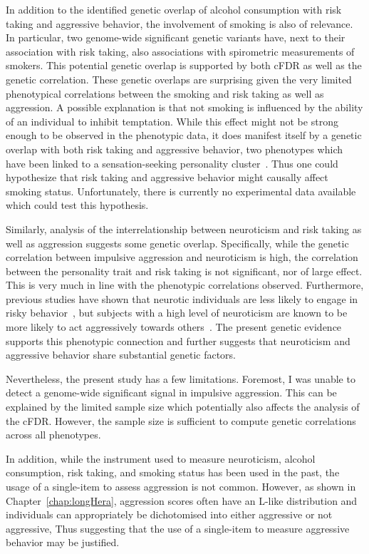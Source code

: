 In addition to the identified genetic overlap of alcohol consumption with risk taking and aggressive behavior, the involvement of smoking is also of relevance.
In particular, two genome-wide significant genetic variants have, next to their association with risk taking, also associations with spirometric measurements of smokers.
This potential genetic overlap is supported by both cFDR as well as the genetic correlation.
These genetic overlaps are surprising given the very limited phenotypical correlations between the smoking and risk taking as well as aggression.
A possible explanation is that not smoking is influenced by the ability of an individual to  inhibit temptation.
While this effect might not be strong enough to be observed in the phenotypic data, it does manifest itself by a genetic overlap with both risk taking and aggressive behavior,
two phenotypes which have been linked to a sensation-seeking personality cluster~\cite{Zuckerman2000}.
Thus one could hypothesize that risk taking and aggressive behavior might causally affect smoking status.
Unfortunately, there is currently no experimental data available which could test this hypothesis.

Similarly, analysis of the interrelationship between neuroticism and risk taking as well as aggression suggests some genetic overlap.
Specifically, while the genetic correlation between impulsive aggression and neuroticism is high, the correlation between the personality trait and risk taking is not significant, nor of large effect.
This is very much in line with the phenotypic correlations observed.
Furthermore, previous studies have shown that neurotic individuals are less likely to engage in risky behavior~\cite{Lauriola2001,InstituteofMedicine2011,Paulus2003}, but subjects with a high level of neuroticism are known to be more likely to act aggressively towards others~\cite{Meesters2007}.
The present genetic evidence supports this phenotypic connection and further suggests that neuroticism and aggressive behavior share substantial genetic factors.

Nevertheless, the  present study has a few limitations.
Foremost, I was unable to detect a genome-wide significant signal in impulsive aggression.
This can be explained by the limited sample size which potentially also affects the analysis of the cFDR\@.
However, the sample size is sufficient to compute genetic correlations across all  phenotypes.

In addition, while the instrument used to measure  neuroticism, alcohol consumption, risk taking, and smoking status has been used in the past, the usage of a single-item to assess aggression is not common.
However, as shown in Chapter~\ref{chap:longHera},  aggression scores often have an L-like distribution and individuals can appropriately be dichotomised into either aggressive or not aggressive,
Thus suggesting that the use of a single-item to measure aggressive behavior may be justified.

